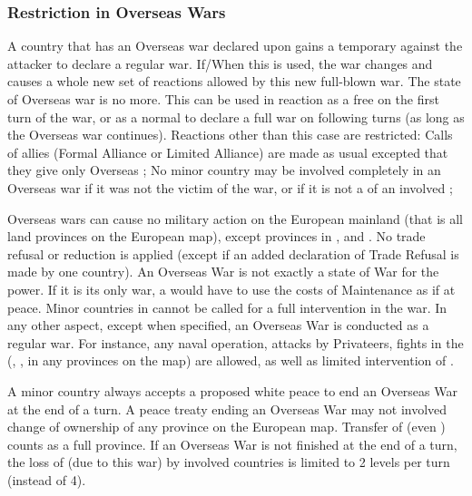 \subsubsection{Restriction in Overseas Wars}
 A country that has an Overseas war declared
upon gains a temporary \CB against the attacker to declare a regular war.
\bparag If/When this \CB is used, the war changes and causes a whole new set
of reactions allowed by this new full-blown war. The state of Overseas war is
no more.
\bparag This \CB can be used in reaction as a free \CB on the first turn of
the war, or as a normal \CB to declare a full war on following turns (as long
as the Overseas war continues).
\aparag Reactions other than this case are restricted:
\bparag Calls of allies (Formal Alliance or Limited Alliance) are made as
usual excepted that they give only Overseas \CB;
\bparag No minor country may be involved completely in an Overseas war if it
was not the victim of the war, or if it is not a \VASSAL of an involved \MAJ;

\bparag Overseas wars can cause no military action on the European mainland
(that is all land provinces on the European map), except provinces in
\Barbaresques,  and .
\bparag No trade refusal or reduction is applied (except if an added
declaration of Trade Refusal is made by one country).
\bparag An Overseas War is not exactly a state of War for the power.  If it is
its only war, a \MAJ would have to use the costs of Maintenance as if at
peace.
\bparag Minor countries in \EG cannot be called for a full intervention in the
war.
\bparag In any other aspect, except when specified, an Overseas War is
conducted as a regular war. For instance, any naval operation, attacks by
Privateers, fights in the \ROTW (\COL, \TP, in any provinces on the \ROTW map)
are allowed, as well as limited intervention of \MIN.

\bparag A minor country always accepts a proposed white peace to end an
Overseas War at the end of a turn.
\bparag A peace treaty ending an Overseas War may not involved change of
ownership of any province on the European map.
\bparag Transfer of \TP (even \Facemoins) counts as a full province.
\bparag If an Overseas War is not finished at the end of a turn, the loss of
\STAB (due to this war) by involved countries is limited to 2 levels per turn
(instead of 4).



